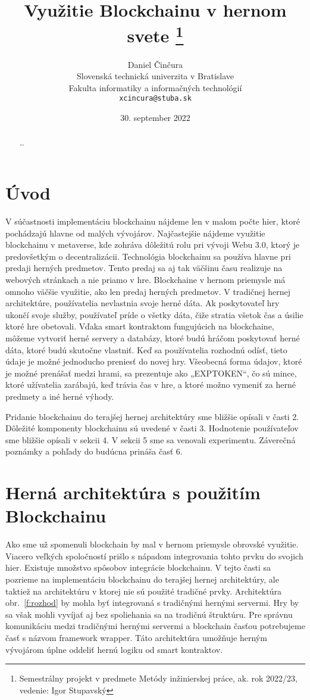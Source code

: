 \documentclass[10pt,twoside,slovak,a4paper]{article}
\title{Využitie Blockchainu v hernom svete
\thanks{Semestrálny projekt v predmete Metódy inžinierskej práce, ak. rok 2022/23, vedenie: Igor Stupavský}}
\author{Daniel Činčura\\[2pt]
	{\small Slovenská technická univerzita v Bratislave}\\
	{\small Fakulta informatiky a informačných technológií}\\
	{\small \texttt{xcincura@stuba.sk}}
	}
\date{\small 30. september 2022}
\begin{document}
\maketitle

\begin{abstract}
\ldots
\end{abstract}



\section{Úvod}

V súčastnosti implementáciu blockchainu nájdeme len v malom počte hier, ktoré pochádzajú hlavne od malých vývojárov. Najčastejšie nájdeme využitie blockchainu v metaverse, kde zohráva dôležitú rolu pri vývoji Webu 3.0, ktorý je predovšetkým o decentralizácii. Technológia blockchainu sa používa hlavne pri predaji herných predmetov. Tento predaj sa aj tak väčšinu času realizuje na webových stránkach a nie priamo v hre. Blockchaine v hernom priemysle má omnoho väčšie využitie, ako len predaj herných predmetov.
V tradičnej hernej architektúre, používatelia nevlastnia svoje herné dáta. Ak poskytovateľ hry ukončí svoje služby, používateľ príde o všetky dáta, čiže stratia všetok čas a úsilie ktoré hre obetovali. Vďaka smart kontraktom fungujúcich na blockchaine, môžeme vytvoriť herné servery a databázy, ktoré budú hráčom poskytovať herné dáta, ktoré budú skutočne vlastniť. Keď sa používatelia rozhodnú odísť, tieto údaje je možné jednoducho preniesť do novej hry. Všeobecná forma údajov, ktoré je možné prenášať medzi hrami, sa prezentuje ako „EXPTOKEN“, čo sú mince, ktoré užívatelia zarábajú, keď trávia čas v hre, a ktoré možno vymeniť za herné predmety a iné herné výhody.

Pridanie blockchainu do terajšej hernej architektúry sme bližšie opísali v časti 2. Dôležité komponenty blockchainu sú uvedené v časti 3. Hodnotenie používateľov sme bližšie opísali v sekcii 4. V sekcii 5 sme sa venovali experimentu. Záverečná poznámky a pohľady do budúcna prináša časť 6.




\section{Herná architektúra s použitím Blockchainu} \label{nejaka}

Ako sme už spomenuli blockchain by mal v hernom priemysle obrovské využitie. Viacero veľkých spoločností prišlo s nápadom integrovania tohto prvku do svojich hier. Existuje množstvo spôsobov integrácie blockchainu. V tejto časti sa pozrieme na implementáciu blockchainu do terajšej hernej architektúry, ale taktiež na architektúru v ktorej nie sú použité tradičné prvky. Architektúra obr.~\ref{f:rozhod} by mohla byť integrovaná s tradičnými hernými servermi. Hry by sa však mohli vyvíjať aj bez spoliehania sa na tradičnú štruktúru. Pre správnu komunikáciu medzi tradičnými hernými servermi a blockchain časťou potrebujeme časť s názvom framework wrapper. Táto architektúra umožňuje herným vývojárom úplne oddeliť hernú logiku od smart kontraktov.  
\end{document}
